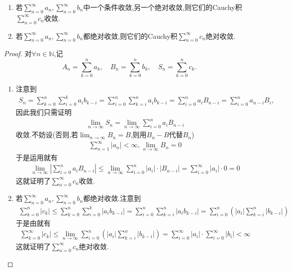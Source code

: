 \documentclass[../../main.tex]{subfiles}%
\begin{document}
\begin{theorem}[Cauchy积收敛定理]\label{theorem:Cauchy积收敛定理}
\begin{enumerate}[(1)]
\item 若$\sum\limits_{n=0}^{\infty} a_n,\sum\limits_{n=0}^{\infty} b_n$中一个条件收敛,另一个绝对收敛,则它们的Cauchy积$\sum\limits_{n=0}^{\infty} c_n$收敛.

\item 若$\sum\limits_{n=0}^{\infty} a_n,\sum\limits_{n=0}^{\infty} b_n$都绝对收敛,则它们的Cauchy积$\sum\limits_{n=0}^{\infty} c_n$绝对收敛.
\end{enumerate}
\end{theorem}
\begin{proof}

对$\forall n\in \mathbb{N}$,记
\[
A_n = \sum_{k = 0}^{n} a_k,\quad B_n = \sum_{k = 0}^{n} b_k,\quad S_n = \sum_{k = 0}^{n} c_k.
\]
\begin{enumerate}[(1)]
\item 注意到
\begin{align*}
S_n = \sum\limits_{k=0}^{n} \sum\limits_{i=0}^{k} a_i b_{k-i} = \sum\limits_{i=0}^{n} \sum\limits_{k=i}^{n} a_i b_{k-i} = \sum\limits_{i=0}^{n} a_i B_{n-i} = \sum\limits_{i=0}^{n} a_{n-i} B_i,
\end{align*}
因此我们只需证明
\begin{align*}
\lim\limits_{n\to\infty} S_n = \lim\limits_{n\to\infty}\sum\limits_{i=0}^{n} a_i B_{n-i}
\end{align*}
收敛.不妨设(否则,若$\lim_{n\to\infty}B_n=B$,则用$B_n-B$代替$B_n$)
\begin{align*}
\sum\limits_{n=1}^{\infty} |a_n| < \infty,\lim\limits_{n\to\infty} B_n = 0
\end{align*}
于是运用就有
\begin{align*}
\lim\limits_{n\to\infty} \left| \sum\limits_{i=0}^{n} a_i B_{n-i} \right| \leqslant \lim\limits_{n\to\infty} \sum\limits_{i=0}^{n} |a_i| \cdot |B_{n-i}| = \sum\limits_{i=0}^{\infty} |a_i| \cdot 0 = 0
\end{align*}
这就证明了$\sum\limits_{n=0}^{\infty} c_n$收敛.

\item 若$\sum\limits_{n=0}^{\infty} a_n,\sum\limits_{n=0}^{\infty} b_n$都绝对收敛.注意到
\begin{align*}
\sum\limits_{k=0}^{n} |c_k| \leqslant \sum\limits_{k=0}^{n} \sum\limits_{i=0}^{k} |a_i b_{k-i}| = \sum\limits_{i=0}^{n} \sum\limits_{k=i}^{n} |a_i b_{k-i}| = \sum\limits_{i=0}^{n} \left( |a_i| \sum\limits_{k=i}^{n} |b_{k-i}| \right)
\end{align*}
于是由就有
\begin{align*}
\sum\limits_{k=0}^{\infty} |c_k| \leqslant \lim\limits_{n\to\infty} \sum\limits_{i=0}^{n} \left( |a_i| \sum\limits_{k=i}^{n} |b_{k-i}| \right) = \sum\limits_{i=0}^{\infty} |a_i| \cdot \sum\limits_{i=0}^{\infty} |b_i| < \infty
\end{align*}
这就证明了$\sum\limits_{n=0}^{\infty} c_n$绝对收敛.
\end{enumerate}

\end{proof}
\end{document}
